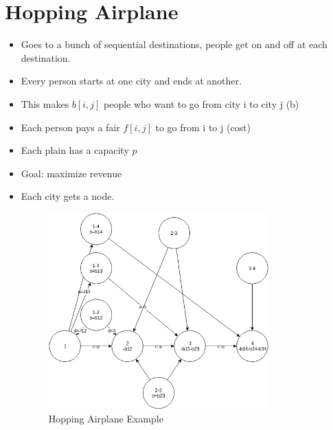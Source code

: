 \documentclass[12pt, letter]{article}
\begin{document}
\section{Hopping Airplane}%
\label{sec:hopping_airplane}
\begin{itemize}
	\item Goes to a bunch of sequential destinations, people get on and off at each destination.
	\item Every person starts at one city and ends at another.
	\item This makes $b[i,j]$ people who want to go from city i to city j (b)
	\item Each person pays a fair $f[i,j]$ to go from i to j (cost)
	\item Each plain has a capacity $p$
	\item Goal: maximize revenue
	\item Each city gets a node.
	\begin{figure}[h]
		\centering
		\includegraphics[width=0.8\textwidth]{airplane}
		\caption{Hopping Airplane Example}
		\label{fig:airplane}
	\end{figure}

\end{itemize}
\end{document}

